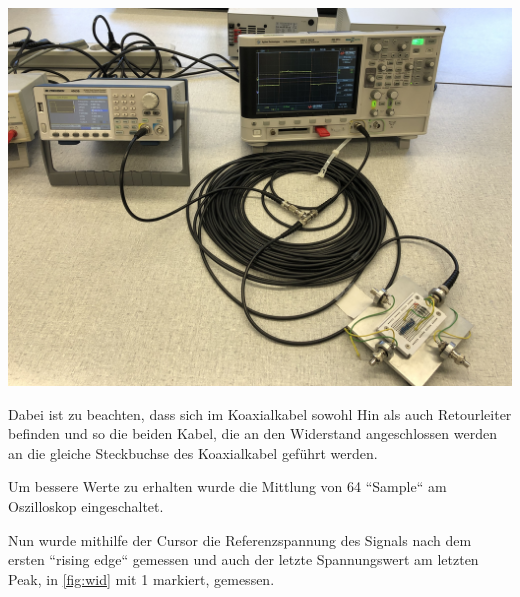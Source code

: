 \documentclass[11pt,ngerman]{scrartcl}
\begin{document}
\begin{center}
	\begin{minipage}[t]{0.7\textwidth}
		\includegraphics[width=\textwidth]{aufbau2}
		\label{fig:aufbau2}
	\end{minipage}
\end{center}

\noindent Dabei ist zu beachten, dass sich im Koaxialkabel sowohl Hin als auch Retourleiter befinden und so die beiden Kabel, die an den Widerstand angeschlossen werden an die gleiche Steckbuchse des Koaxialkabel geführt werden.

\vspace{2mm}

\noindent Um bessere Werte zu erhalten wurde die Mittlung von 64 ``Sample``  am Oszilloskop eingeschaltet.

\vspace{2mm}

\noindent Nun wurde mithilfe der Cursor die Referenzspannung des Signals nach dem ersten ``rising edge`` gemessen und auch der letzte Spannungswert am letzten Peak, in \autoref{fig:wid} mit 1 markiert, gemessen.
\end{document}

